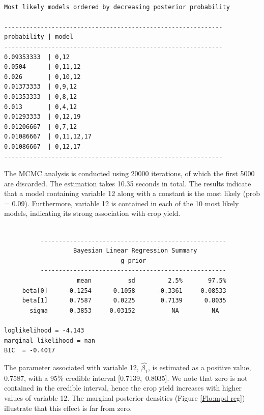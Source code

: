 \documentclass[article]{jss}
\begin{document}
%
\begin{minipage}[t]{1\columnwidth}%
\begin{verbatim}

Most likely models ordered by decreasing posterior probability

------------------------------------------------------------
probability | model       
------------------------------------------------------------
0.09353333  | 0,12        
0.0504      | 0,11,12     
0.026       | 0,10,12     
0.01373333  | 0,9,12      
0.01353333  | 0,8,12      
0.013       | 0,4,12      
0.01293333  | 0,12,19     
0.01206667  | 0,7,12      
0.01086667  | 0,11,12,17  
0.01086667  | 0,12,17     
------------------------------------------------------------

\end{verbatim}%
\end{minipage}

The MCMC analysis is conducted using 20000 iterations, of which the
first 5000 are discarded. The estimation takes 10.35 seconds in total.
The results indicate that a model containing variable 12 along with a
constant is the most likely (prob = 0.09). Furthermore, variable 12 is
contained in each of the 10 most likely models, indicating its strong
association with crop yield.

%
\begin{minipage}[t]{1\columnwidth}%
\begin{verbatim}

          ---------------------------------------------------           
                   Bayesian Linear Regression Summary                   
                                g_prior                                 
          ---------------------------------------------------           
                    mean          sd         2.5%       97.5%
     beta[0]     -0.1254      0.1058      -0.3361     0.08533
     beta[1]      0.7587      0.0225       0.7139      0.8035
       sigma      0.3853     0.03152          NA         NA

loglikelihood = -4.143      
marginal likelihood = nan         
BIC  = -0.4017     

\end{verbatim}%
\end{minipage}

The parameter associated with variable 12, $\hat{\beta_{1}}$, is
estimated as a positive value, 0.7587, with a 95\% credible interval
{[}0.7139,~0.8035{]}. We note that zero is not contained in the
credible interval, hence the crop yield increases with higher values
of variable 12. The marginal posterior densities (Figure \ref{Flo:mpd
  reg}) illustrate that this effect is far from zero. %
\end{document}
